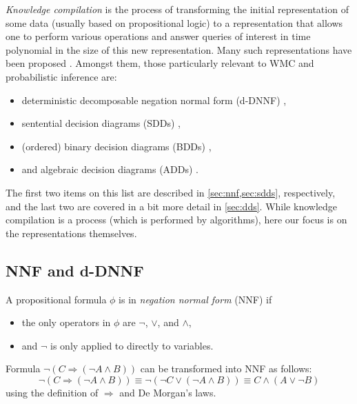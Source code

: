 \emph{Knowledge compilation} is the process of transforming the initial representation of some data (usually based on propositional logic) to a representation that allows one to perform various operations and answer queries of interest in time polynomial in the size of this new representation. Many such representations have been proposed \citep{DBLP:journals/jair/DarwicheM02}. Amongst them, those particularly relevant to WMC and probabilistic inference are:
\begin{itemize}
\item deterministic decomposable negation normal form (d-DNNF) \citep{DBLP:journals/jancl/Darwiche01},
\item sentential decision diagrams (SDDs) \citep{DBLP:conf/ijcai/Darwiche11},
\item (ordered) binary decision diagrams (BDDs) \citep{DBLP:journals/tc/Bryant86},
\item and algebraic decision diagrams (ADDs) \citep{DBLP:journals/fmsd/BaharFGHMPS97}.
\end{itemize}
The first two items on this list are described in \cref{sec:nnf,sec:sdds}, respectively, and the last two are covered in a bit more detail in \cref{sec:dds}. While knowledge compilation is a process (which is performed by algorithms), here our focus is on the representations themselves.

\subsection{NNF and d-DNNF} \label{sec:nnf}

\begin{definition}
  A propositional formula $\phi$ is in \emph{negation normal form} (NNF) if
  \begin{itemize}
  \item the only operators in $\phi$ are $\neg$, $\lor$, and $\land$,
  \item and $\neg$ is only applied to directly to variables.
  \end{itemize}
\end{definition}

\begin{example}
  Formula $\neg(C \Rightarrow (\neg A \land B))$ can be transformed into NNF as follows:
  \[
  \neg(C \Rightarrow (\neg A \land B)) \equiv \neg(\neg C \lor (\neg A \land B)) \equiv C \land (A \lor \neg B)
  \]
  using the definition of $\Rightarrow$ and De Morgan's laws.
\end{example}

